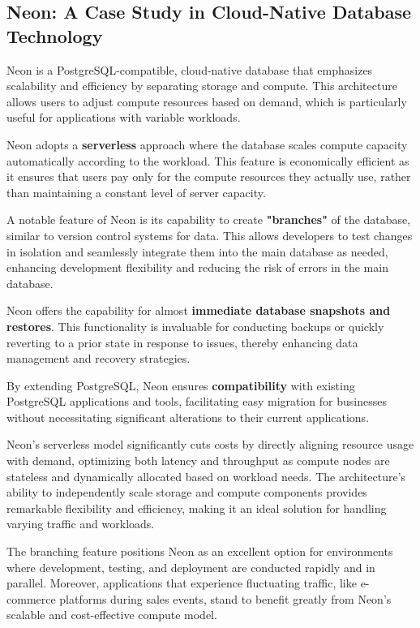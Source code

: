\subsection{Neon: A Case Study in Cloud-Native Database Technology}

Neon is a PostgreSQL-compatible, cloud-native database that emphasizes
scalability and efficiency by separating storage and compute. This architecture
allows users to adjust compute resources based on demand, which is particularly
useful for applications with variable workloads.

Neon adopts a \textbf{serverless} approach where the database scales compute
capacity automatically according to the workload. This feature is economically
efficient as it ensures that users pay only for the compute resources they
actually use, rather than maintaining a constant level of server capacity.

A notable feature of Neon is its capability to create \textbf{"branches"} of the
database, similar to version control systems for data. This allows developers to
test changes in isolation and seamlessly integrate them into the main database
as needed, enhancing development flexibility and reducing the risk of errors in
the main database.

Neon offers the capability for almost \textbf{immediate database snapshots and
restores}. This functionality is invaluable for conducting backups or quickly
reverting to a prior state in response to issues, thereby enhancing data
management and recovery strategies.

By extending PostgreSQL, Neon ensures \textbf{compatibility} with existing
PostgreSQL applications and tools, facilitating easy migration for businesses
without necessitating significant alterations to their current applications.

Neon's serverless model significantly cuts costs by directly aligning resource
usage with demand, optimizing both latency and throughput as compute nodes are
stateless and dynamically allocated based on workload needs. The architecture’s
ability to independently scale storage and compute components provides
remarkable flexibility and efficiency, making it an ideal solution for handling
varying traffic and workloads.

The branching feature positions Neon as an excellent option for environments
where development, testing, and deployment are conducted rapidly and in
parallel. Moreover, applications that experience fluctuating traffic, like
e-commerce platforms during sales events, stand to benefit greatly from Neon’s
scalable and cost-effective compute model.

